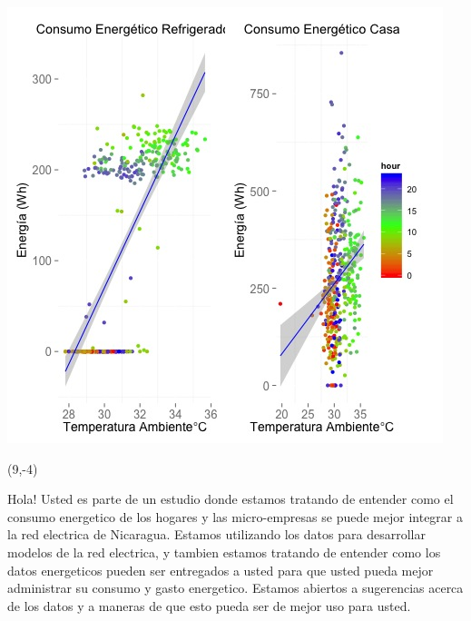 \documentclass{article}\usepackage[]{graphicx}\usepackage[]{color}
\newenvironment{knitrout}{}{} %
\begin{document}
\begin{knitrout}
\color{fgcolor}
\includegraphics[scale=0.75]{figure/A24_correlaciones} 
\end{knitrout}

 \begin{textblock}{1}(9,-4)
\begin{minipage}{20em}
\begingroup

\endgroup
\end{minipage}
\end{textblock}

\vspace{70px}
\begin{knitrout}
Hola! Usted es parte de un estudio donde estamos tratando de entender como el consumo energetico de los hogares y las micro-empresas se puede mejor integrar a la red electrica de Nicaragua. Estamos utilizando los datos para desarrollar modelos de la red electrica, y tambien estamos tratando de entender como los datos energeticos pueden ser entregados a usted para que usted pueda mejor administrar su consumo y gasto energetico.  Estamos abiertos a sugerencias acerca de los datos y a maneras de que esto pueda ser de mejor uso para usted.
\end{knitrout}
\end{document}
